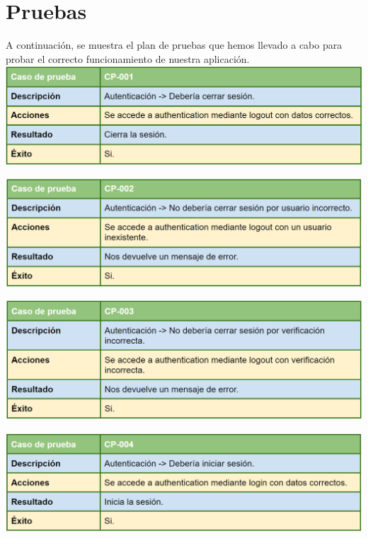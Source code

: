 \chapter{Pruebas}\label{pruebas}

A continuación, se muestra el plan de pruebas que hemos llevado a cabo para probar el correcto funcionamiento de nuestra aplicación.\\

\includegraphics[width=\textwidth]{img/cap7/cp-001.png}

\bigskip

\includegraphics[width=\textwidth]{img/cap7/cp-002.png}

\bigskip

\includegraphics[width=\textwidth]{img/cap7/cp-003.png}

\bigskip

\includegraphics[width=\textwidth]{img/cap7/cp-004.png}

